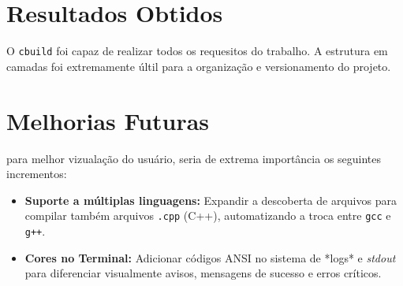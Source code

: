 \documentclass[a4paper]{article}
\begin{document}
\section{Resultados Obtidos}
O \texttt{cbuild} foi capaz de realizar todos os requesitos do trabalho. A estrutura em camadas foi extremamente últil para a organização e versionamento do projeto.

\section{Melhorias Futuras}
para melhor vizualação do usuário, seria de extrema importância os seguintes incrementos:
\begin{itemize}
    \item \textbf{Suporte a múltiplas linguagens:} Expandir a descoberta de arquivos para compilar também arquivos \texttt{.cpp} (C++), automatizando a troca entre \texttt{gcc} e \texttt{g++}.
    \item \textbf{Cores no Terminal:} Adicionar códigos ANSI no sistema de *logs* e \textit{stdout} para diferenciar visualmente avisos, mensagens de sucesso e erros críticos.
\end{itemize}
\end{document}
